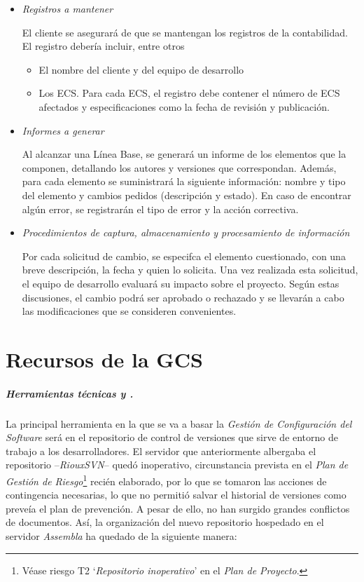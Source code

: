 \documentclass[11pt, a4paper, twoside, titlepage]{article}
\begin{document}
			\begin{itemize}
				\item \textit{Registros a mantener}

				El cliente se asegurará de que se mantengan los registros de la contabilidad. El registro debería incluir, entre otros
					\begin{itemize}
					\item El nombre del cliente y del equipo de desarrollo 
					\item Los ECS. Para cada ECS, el registro debe contener el número de ECS afectados y especificaciones como la fecha de revisión y publicación.
					\end{itemize}

				\item \textit{Informes a generar}

				Al alcanzar una Línea Base, se generará un informe de los elementos que la componen, detallando los autores y versiones que correspondan. Además, para cada elemento se suministrará la siguiente información: nombre y tipo del elemento y cambios pedidos (descripción y estado). En caso de encontrar algún error, se registrarán el tipo de error y la acción correctiva.

				\item \textit{Procedimientos de captura, almacenamiento y procesamiento de información}

				Por cada solicitud de cambio, se especifca el elemento cuestionado, con una breve descripción, la fecha y quien lo solicita. Una vez realizada esta solicitud, el equipo de desarrollo evaluará su impacto sobre el proyecto. Según estas discusiones, el cambio podrá ser aprobado o rechazado y se llevarán a cabo las modificaciones que se consideren convenientes. 

			\end{itemize}


	\section{Recursos de la GCS} %

		\subparagraph{Herramientas técnicas y \software.} La principal herramienta en la que se va a basar la \textit{Gestión de Configuración del Software} será en el repositorio de control de versiones que sirve de entorno de trabajo a los desarrolladores. El servidor que anteriormente albergaba el repositorio --\textit{RiouxSVN}-- quedó inoperativo, circunstancia prevista en el \textit{Plan de Gestión de Riesgo}\footnote{Véase riesgo T2 `\textit{Repositorio inoperativo}' en el \textit{Plan de Proyecto}.} recién elaborado, por lo que se tomaron las acciones de contingencia necesarias, lo que no permitió salvar el historial de versiones como preveía el plan de prevención. A pesar de ello, no han surgido grandes conflictos de documentos. Así, la organización del nuevo repositorio hospedado en el servidor \textit{Assembla} ha quedado de la siguiente manera: \\
			
\end{document}
